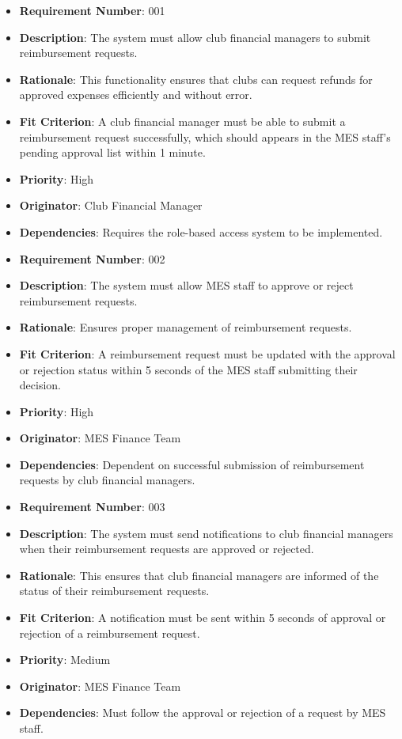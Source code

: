 \documentclass[12pt]{article}
\begin{document}
\begin{itemize}

  \item \textbf{Requirement Number}: 001
  \item \textbf{Description}: The system must allow club financial managers to submit reimbursement requests.
  \item \textbf{Rationale}: This functionality ensures that clubs can request refunds for approved expenses efficiently and without error.
  \item \textbf{Fit Criterion}: A club financial manager must be able to submit a reimbursement request successfully, which should appears in the MES staff's pending approval list within 1 minute.
  \item \textbf{Priority}: High
  \item \textbf{Originator}: Club Financial Manager
  \item \textbf{Dependencies}: Requires the role-based access system to be implemented.
  
  \bigskip

  \item \textbf{Requirement Number}: 002
  \item \textbf{Description}: The system must allow MES staff to approve or reject reimbursement requests.
  \item \textbf{Rationale}: Ensures proper management of reimbursement requests.
  \item \textbf{Fit Criterion}: A reimbursement request must be updated with the approval or rejection status within 5 seconds of the MES staff submitting their decision.
  \item \textbf{Priority}: High
  \item \textbf{Originator}: MES Finance Team
  \item \textbf{Dependencies}: Dependent on successful submission of reimbursement requests by club financial managers.

  \bigskip

  \item \textbf{Requirement Number}: 003
  \item \textbf{Description}: The system must send notifications to club financial managers when their reimbursement requests are approved or rejected.
  \item \textbf{Rationale}: This ensures that club financial managers are informed of the status of their reimbursement requests.
  \item \textbf{Fit Criterion}: A notification must be sent within 5 seconds of approval or rejection of a reimbursement request.
  \item \textbf{Priority}: Medium
  \item \textbf{Originator}: MES Finance Team
  \item \textbf{Dependencies}: Must follow the approval or rejection of a request by MES staff.


\end{itemize}
\end{document}
